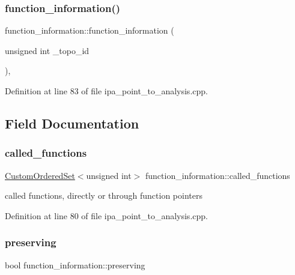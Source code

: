 \subsubsection{\texorpdfstring{function\+\_\+information()}{function\_information()}}
{\footnotesize\ttfamily function\+\_\+information\+::function\+\_\+information (\begin{DoxyParamCaption}\item[{unsigned int}]{\+\_\+topo\+\_\+id }\end{DoxyParamCaption})\hspace{0.3cm}{\ttfamily [inline]}, {\ttfamily [explicit]}}



Definition at line 83 of file ipa\+\_\+point\+\_\+to\+\_\+analysis.\+cpp.



\subsection{Field Documentation}
\mbox{\label{structfunction__information_a15bcc023670df2a2b924bb7c14c10855}} 
\subsubsection{\texorpdfstring{called\+\_\+functions}{called\_functions}}
{\footnotesize\ttfamily \hyperlink{classCustomOrderedSet}{Custom\+Ordered\+Set}$<$unsigned int$>$ function\+\_\+information\+::called\+\_\+functions}



called functions, directly or through function pointers 



Definition at line 80 of file ipa\+\_\+point\+\_\+to\+\_\+analysis.\+cpp.

\mbox{\label{structfunction__information_ae2e7d471c2418e2c5113cb574174c828}} 
\subsubsection{\texorpdfstring{preserving}{preserving}}
{\footnotesize\ttfamily bool function\+\_\+information\+::preserving}



